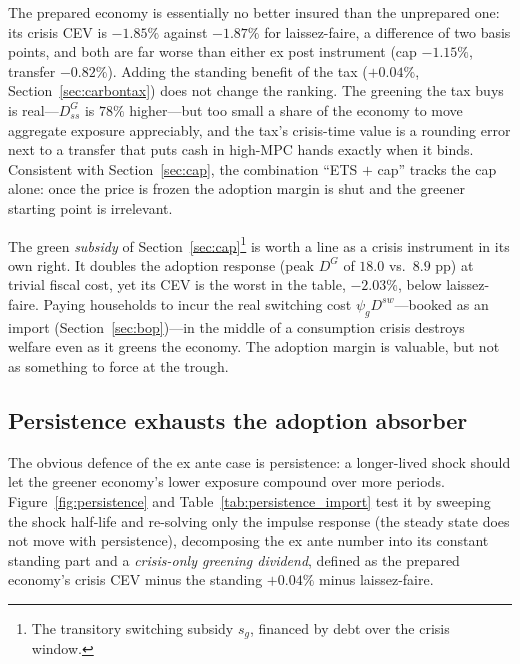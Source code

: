 \documentclass[11pt,a4paper]{article}
\begin{document}


The prepared economy is essentially no better insured than the unprepared one:
its crisis CEV is $-1.85\%$ against $-1.87\%$ for laissez-faire, a difference of
two basis points, and both are far worse than either ex post instrument (cap
$-1.15\%$, transfer $-0.82\%$). Adding the standing benefit of the tax
($+0.04\%$, Section~\ref{sec:carbontax}) does not change the ranking. The
greening the tax buys is real---$D^{G}_{ss}$ is $78\%$ higher---but too small a
share of the economy to move aggregate exposure appreciably, and the tax's
crisis-time value is a rounding error next to a transfer that puts cash in
high-MPC hands exactly when it binds. Consistent with Section~\ref{sec:cap}, the
combination ``ETS $+$ cap'' tracks the cap alone: once the price is frozen the
adoption margin is shut and the greener starting point is irrelevant.

The green \emph{subsidy} of Section~\ref{sec:cap}\footnote{The transitory
switching subsidy $s_g$, financed by debt over the crisis window.} is worth a
line as a crisis instrument in its own right. It doubles the adoption response
(peak $D^{G}$ of $18.0$ vs.\ $8.9$ pp) at trivial fiscal cost, yet its CEV is
the worst in the table, $-2.03\%$, below laissez-faire. Paying households to
incur the real switching cost $\psi_g D^{sw}$---booked as an import
(Section~\ref{sec:bop})---in the middle of a consumption crisis destroys welfare
even as it greens the economy. The adoption margin is valuable, but not as
something to force at the trough.

\subsection{Persistence exhausts the adoption absorber}
\label{sec:routeA}

The obvious defence of the ex ante case is persistence: a longer-lived shock
should let the greener economy's lower exposure compound over more periods.
Figure~\ref{fig:persistence} and Table~\ref{tab:persistence_import} test it by
sweeping the shock half-life and re-solving only the impulse response (the steady
state does not move with persistence), decomposing the ex ante number into its
constant standing part and a \emph{crisis-only greening dividend}, defined as the
prepared economy's crisis CEV minus the standing $+0.04\%$ minus laissez-faire.


\end{document}
